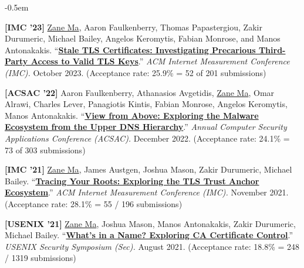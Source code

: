 \documentclass[10pt,singlecolumn]{article} %
\begin{document}
\begin{etaremune}
\itemsep -0.5em 

\item \textbf{[IMC '23]} 
\underline{Zane Ma}, Aaron Faulkenberry, Thomas Papastergiou, Zakir Durumeric, Michael Bailey, Angelos Keromytis, Fabian Monrose, and Manos Antonakakis.
``\textbf{\href{https://zanema.com/papers/imc23_stale_certs.pdf}{Stale TLS Certificates: Investigating Precarious Third-Party Access to Valid TLS Keys}}.''
\emph{ACM Internet Measurement Conference (IMC).} October 2023.
(Acceptance rate: 25.9\% = 52 of 201 submissions)
\vspace{6pt}



\item \textbf{[ACSAC '22]} 
Aaron Faulkenberry, Athanasios Avgetidis, \underline{Zane Ma}, Omar Alrawi, Charles Lever, Panagiotis Kintis, Fabian Monrose, Angelos Keromytis, Manos Antonakakis.
``\textbf{\href{https://zanema.com/papers/acsac22_authdns.pdf}{View from Above: Exploring the Malware Ecosystem from the Upper DNS Hierarchy}}.''
\emph{Annual Computer Security Applications Conference (ACSAC).} December 2022.
(Acceptance rate: 24.1\% = 73 of 303 submissions)
\vspace{6pt}



\item \textbf{[IMC '21]} 
\underline{Zane Ma}, James Austgen, Joshua Mason, Zakir Durumeric, Michael Bailey.
``\textbf{\href{https://zanema.com/papers/imc21_roots.pdf}{Tracing Your Roots: Exploring the TLS Trust Anchor Ecosystem}}.''
\emph{ACM Internet Measurement Conference (IMC).} November 2021.
(Acceptance rate: 28.1\% = 55 / 196 submissions)
\vspace{6pt}


\item \textbf{[USENIX '21]}
\underline{Zane Ma}, Joshua Mason, Manos Antonakakis, Zakir Durumeric, Michael Bailey.
``\textbf{\href{https://zanema.com/papers/usenix21_ca_operators.pdf}{What's in a Name? Exploring CA Certificate Control}}.''
\emph{USENIX Security Symposium (Sec).} August 2021.
(Acceptance rate: 18.8\% = 248 / 1319 submissions)  
\vspace{6pt}


\end{etaremune}
\end{document}
